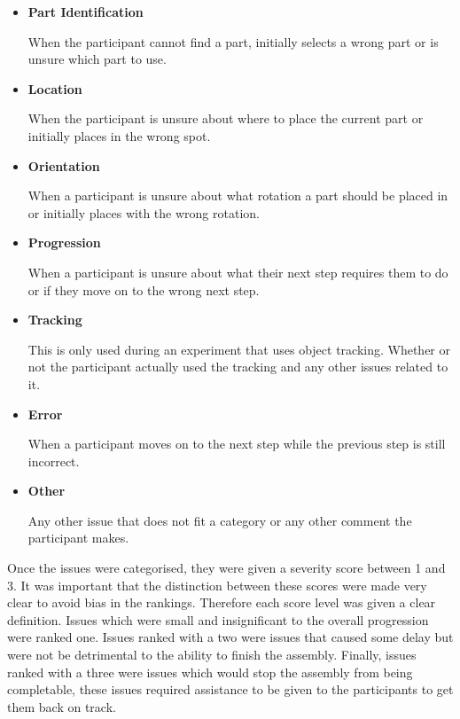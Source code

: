 \documentclass{l4proj}
\begin{document}
\begin{itemize}
    \item \textbf{Part Identification}
    
    When the participant cannot find a part, initially selects a wrong part or is unsure which part to use. 
    
    \item \textbf{Location}
    
    When the participant is unsure about where to place the current part or initially places in the wrong spot.
    
    \item \textbf{Orientation}
    
    When a participant is unsure about what rotation a part should be placed in or initially places with the wrong rotation.
    
    \item \textbf{Progression}
    
    When a participant is unsure about what their next step requires them to do or if they move on to the wrong next step.

    \item \textbf{Tracking}

    This is only used during an experiment that uses object tracking. Whether or not the participant actually used the tracking and any other issues related to it.
    
    \item \textbf{Error}
    
    When a participant moves on to the next step while the previous step is still incorrect.
    
    \item \textbf{Other}
    
    Any other issue that does not fit a category or any other comment the participant makes.
    
\end{itemize}

Once the issues were categorised, they were given a severity score between 1 and 3. It was important that the distinction between these scores were made very clear to avoid bias in the rankings. Therefore each score level was given a clear definition. Issues which were small and insignificant to the overall progression were ranked one. Issues ranked with a two were issues that caused some delay but were not be detrimental to the ability to finish the assembly. Finally, issues ranked with a three were issues which would stop the assembly from being completable, these issues required assistance to be given to the participants to get them back on track.
\end{document}
